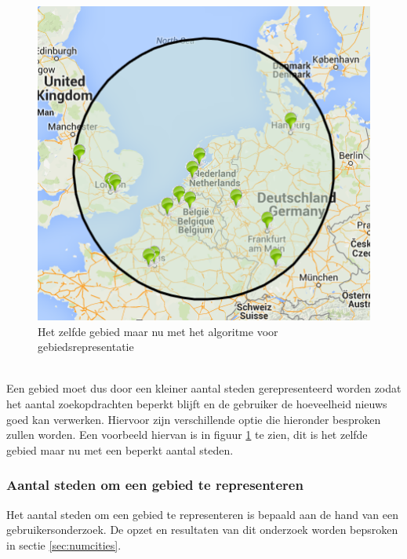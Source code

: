 \documentclass[twoside,openright]{uva-bachelor-thesis}
\begin{document}
		\begin{figure}[!htb]
			\centering
			\includegraphics[scale=1.0]{./img/area_w_algo.png}
			\caption{Het zelfde gebied maar nu met het algoritme voor gebiedsrepresentatie}
			\label{fig:with}
		\end{figure}
		\\[0.5cm]
		Een gebied moet dus door een kleiner aantal steden gerepresenteerd worden zodat het aantal zoekopdrachten beperkt blijft en de gebruiker de hoeveelheid nieuws goed kan verwerken. Hiervoor zijn verschillende optie die hieronder besproken zullen worden. Een voorbeeld hiervan is in figuur \ref{fig:with} te zien, dit is het zelfde gebied maar nu met een beperkt aantal steden.
		
		\subsubsection{Aantal steden om een gebied te representeren}
			Het aantal steden om een gebied te representeren is bepaald aan de hand van een gebruikersonderzoek. De opzet en resultaten van dit onderzoek worden bepsroken in sectie \ref{sec:numcities}.
\end{document}
